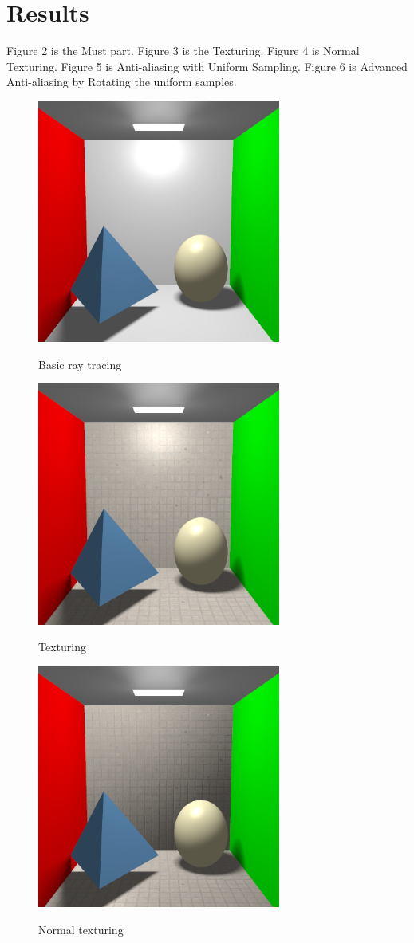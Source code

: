 \documentclass[acmtog]{acmart}
\begin{document}
\section{Results}
\quad Figure 2 is the Must part. Figure 3 is the Texturing. Figure 4 is Normal Texturing. Figure 5 is Anti-aliasing with Uniform Sampling. 
Figure 6 is Advanced Anti-aliasing by Rotating the uniform samples.
\begin{figure}[h]
	\centering
	{\includegraphics[width=8cm]{result1.png}}
	\caption{Basic ray tracing}	
\end{figure}

\begin{figure}[h]
	\centering
	{\includegraphics[width=8cm]{result_t.png}}	
	\caption{Texturing}
\end{figure}


\begin{figure}[h]
	\centering
	{\includegraphics[width=8cm]{result_n.png}}
	\caption{Normal texturing}
\end{figure}
\end{document}
